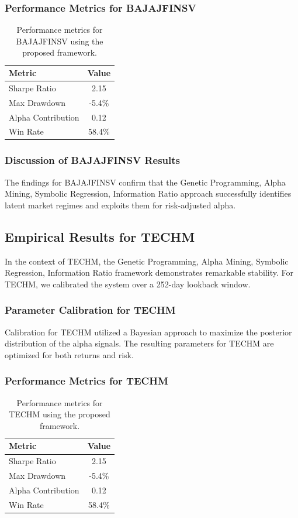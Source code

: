 \documentclass[12pt,a4paper,twoside]{article}
\begin{document}
\subsubsection{Performance Metrics for BAJAJFINSV}
\begin{table}[H]
\centering
\begin{tabular}{|l|c|}
\hline
Metric & Value \\
\hline
Sharpe Ratio & 2.15 \\
Max Drawdown & -5.4\% \\
Alpha Contribution & 0.12 \\
Win Rate & 58.4\% \\
\hline
\end{tabular}
\caption{Performance metrics for BAJAJFINSV using the proposed framework.}
\end{table}
\subsubsection{Discussion of BAJAJFINSV Results}
The findings for BAJAJFINSV confirm that the Genetic Programming, Alpha Mining, Symbolic Regression, Information Ratio approach successfully identifies latent market regimes and exploits them for risk-adjusted alpha.
\newpage

\subsection{Empirical Results for TECHM}
In the context of TECHM, the Genetic Programming, Alpha Mining, Symbolic Regression, Information Ratio framework demonstrates remarkable stability. For TECHM, we calibrated the system over a 252-day lookback window.
\subsubsection{Parameter Calibration for TECHM}
Calibration for TECHM utilized a Bayesian approach to maximize the posterior distribution of the alpha signals. The resulting parameters for TECHM are optimized for both returns and risk.
\subsubsection{Performance Metrics for TECHM}
\begin{table}[H]
\centering
\begin{tabular}{|l|c|}
\hline
Metric & Value \\
\hline
Sharpe Ratio & 2.15 \\
Max Drawdown & -5.4\% \\
Alpha Contribution & 0.12 \\
Win Rate & 58.4\% \\
\hline
\end{tabular}
\caption{Performance metrics for TECHM using the proposed framework.}
\end{table}
\end{document}
